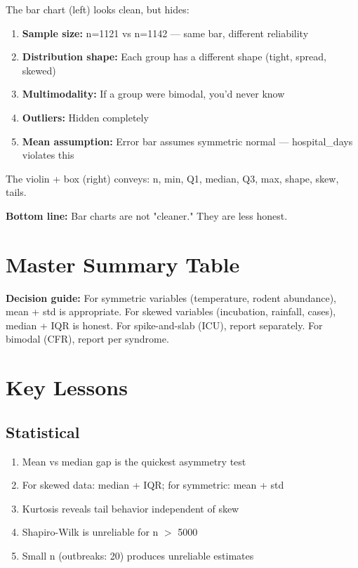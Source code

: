 \documentclass[11pt,a4paper]{article}
\begin{document}
The bar chart (left) looks clean, but hides:
\begin{enumerate}
\item \textbf{Sample size:} n=1121 vs n=1142 --- same bar, different reliability
\item \textbf{Distribution shape:} Each group has a different shape (tight, spread, skewed)
\item \textbf{Multimodality:} If a group were bimodal, you'd never know
\item \textbf{Outliers:} Hidden completely
\item \textbf{Mean assumption:} Error bar assumes symmetric normal --- hospital\_days violates this
\end{enumerate}

The violin + box (right) conveys: n, min, Q1, median, Q3, max, shape, skew, tails.

\textbf{Bottom line:} Bar charts are not "cleaner." They are less honest.

\newpage

\section{Master Summary Table}

\begin{table}[htbp]
\centering
\resizebox{\textwidth}{!}{

}
\end{table}

\textbf{Decision guide:} For symmetric variables (temperature, rodent abundance), mean + std
is appropriate. For skewed variables (incubation, rainfall, cases), median + IQR is honest.
For spike-and-slab (ICU), report separately. For bimodal (CFR), report per syndrome.

\section{Key Lessons}

\subsection{Statistical}
\begin{enumerate}
\item Mean vs median gap is the quickest asymmetry test
\item For skewed data: median + IQR; for symmetric: mean + std
\item Kurtosis reveals tail behavior independent of skew
\item Shapiro-Wilk is unreliable for n $>$ 5000
\item Small n (outbreaks: 20) produces unreliable estimates
\end{enumerate}
\end{document}
